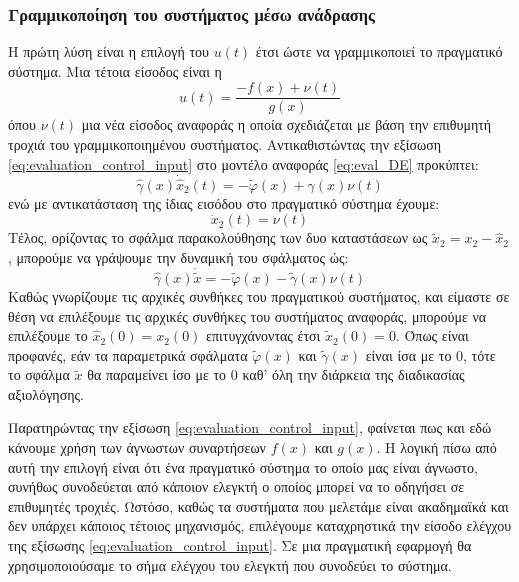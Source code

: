 \subsubsection{Γραμμικοποίηση του συστήματος μέσω ανάδρασης}
Η πρώτη λύση είναι η επιλογή του $u(t)$ έτσι ώστε να γραμμικοποιεί το πραγματικό σύστημα. Μια τέτοια είσοδος είναι η
\begin{equation}
	u(t) =  \frac{- f(x) + \nu(t)}{g(x)}
	\label{eq:evaluation_control_input}
\end{equation}
όπου $\nu(t)$ μια νέα είσοδος αναφοράς η οποία σχεδιάζεται με βάση την επιθυμητή τροχιά του γραμμικοποιημένου συστήματος. Αντικαθιστώντας την εξίσωση \ref{eq:evaluation_control_input} στο μοντέλο αναφοράς \ref{eq:eval_DE} προκύπτει:
\begin{equation}
	\hat{\gamma}(x) \dot{\hat{x}}_2(t) = -\tilde{\varphi}(x) + \gamma(x) \nu(t)
\end{equation}
ενώ με αντικατάσταση της ίδιας εισόδου στο πραγματικό σύστημα έχουμε:
\begin{equation}
\dot{x}_2(t) = \nu(t)
\end{equation}
Τέλος, ορίζοντας το σφάλμα παρακολούθησης των δυο καταστάσεων ως $\tilde{x}_2 = x_2 - \hat{x}_2$, μπορούμε να γράψουμε την δυναμική του σφάλματος ώς:
\begin{equation}
	\hat{\gamma}(x) \dot{\tilde{x}} = -\tilde{\varphi}(x)  -\tilde{\gamma}(x) \nu(t)
	\label{eq:evaluation_error_DE_1}
\end{equation}
Καθώς γνωρίζουμε τις αρχικές συνθήκες του πραγματικού συστήματος, και είμαστε σε θέση να επιλέξουμε τις αρχικές συνθήκες του συστήματος αναφοράς, μπορούμε να επιλέξουμε το $\hat{x}_2(0) = x_2(0)$ επιτυγχάνοντας έτσι $\tilde{x}_2(0) = 0$. Όπως είναι προφανές, εάν τα παραμετρικά σφάλματα $\tilde{\varphi}(x)$ και $\tilde{\gamma}(x)$ είναι ίσα με το $0$, τότε το σφάλμα $\tilde{x}$ θα παραμείνει ίσο με το $0$ καθ' όλη την διάρκεια της διαδικασίας αξιολόγησης.\\
\begin{remark}
	Παρατηρώντας την εξίσωση \ref{eq:evaluation_control_input}, φαίνεται πως και εδώ κάνουμε χρήση των άγνωστων συναρτήσεων $f(x)$ και $g(x)$. Η λογική πίσω από αυτή την επιλογή είναι ότι  ένα πραγματικό σύστημα το οποίο μας είναι άγνωστο, συνήθως συνοδεύεται από κάποιον ελεγκτή ο οποίος μπορεί να το οδηγήσει σε επιθυμητές τροχιές. Ωστόσο, καθώς τα συστήματα που μελετάμε είναι ακαδημαϊκά και δεν υπάρχει κάποιος τέτοιος μηχανισμός, επιλέγουμε καταχρηστικά την είσοδο ελέγχου της εξίσωσης \ref{eq:evaluation_control_input}. Σε μια πραγματική εφαρμογή θα χρησιμοποιούσαμε το σήμα ελέγχου του ελεγκτή που συνοδεύει το σύστημα.
\end{remark}

